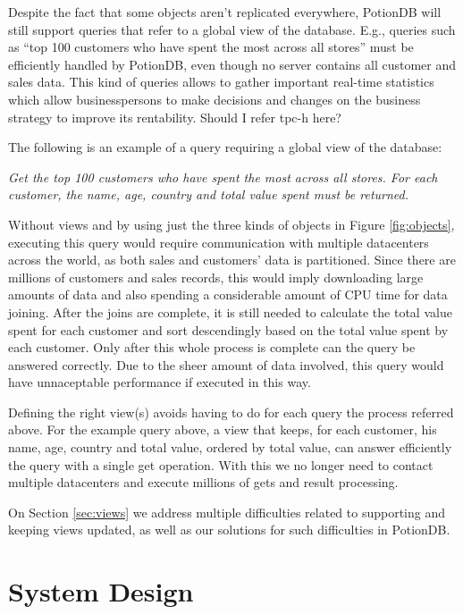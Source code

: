 \documentclass{vldb}
\newcommand{\grumbler}[2]{{\color{red}{\bf #1:} #2}}
\newcommand{\andre}[1]{\grumbler{andre}{#1}}
\newcommand{\emphvspace}{0.5\baselineskip}
\newcommand{\lineemph}[1]{\vspace{\emphvspace}\hspace{2em}\emph{#1}\vspace{\emphvspace}}
\begin{document}
Despite the fact that some objects aren't replicated everywhere, PotionDB will still support queries that refer to a global view of the database.
E.g., queries such as ``top 100 customers who have spent the most across all stores'' must be efficiently handled by PotionDB, even though no server contains all customer and sales data. 
This kind of queries allows to gather important real-time statistics which allow businesspersons to make decisions and changes on the business strategy to improve its rentability.
\andre{Should I refer tpc-h here?}

The following is an example of a query requiring a global view of the database:

\lineemph{Get the top 100 customers who have spent the most across all stores. For each customer, the name, age, country and total value spent must be returned.}

Without views and by using just the three kinds of objects in Figure \ref{fig:objects}, executing this query would require communication with multiple datacenters across the world, as both sales and customers' data is partitioned.
Since there are millions of customers and sales records, this would imply downloading large amounts of data and also spending a considerable amount of CPU time for data joining.
After the joins are complete, it is still needed to calculate the total value spent for each customer and sort descendingly based on the total value spent by each customer.
Only after this whole process is complete can the query be answered correctly.
Due to the sheer amount of data involved, this query would have unnaceptable performance if executed in this way.

Defining the right view(s) avoids having to do for each query the process referred above.
For the example query above, a view that keeps, for each customer, his name, age, country and total value, ordered by total value, can answer efficiently the query with a single get operation.
With this we no longer need to contact multiple datacenters and execute millions of gets and result processing.

On Section \ref{sec:views} we address multiple difficulties related to supporting and keeping views updated, as well as our solutions for such difficulties in PotionDB.

\section{System Design}
\end{document}
